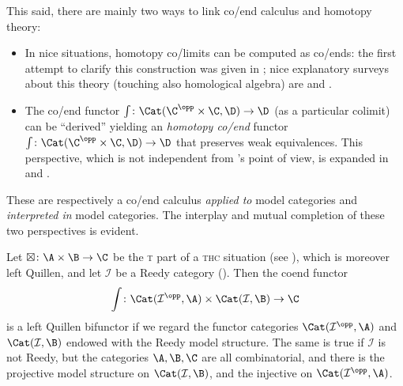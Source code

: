 This said, there are mainly two ways to link co/end calculus and homotopy theory:
\begin{itemize}
\item In nice situations, homotopy co/limits can be computed as co/ends: the first attempt to clarify this construction was given in \cite{MR0365573}; nice explanatory surveys about this theory (touching also homological algebra) are \cite{hormann2014homotopy} and \cite{Gamb}.%
\item The co/end functor $\int\colon \Cat(\C^\opp\times\C,\D)\to \D$ (as a particular colimit) can be ``derived'' yielding an \emph{homotopy co/end} functor $\int\colon \Cat(\C^\opp\times\C,\D)\to \D$ that preserves weak equivalences. This perspective, which is not independent from \cite{cordier1997homotopy}'s point of view, is expanded in \cite{DrorFar98} and \cite{Isaacson}.
\end{itemize}
These are respectively a co/end calculus \emph{applied to} model categories and \emph{interpreted in} model categories. The interplay and mutual completion of these two perspectives is evident.

\begin{remark}\label{coend_is_quillen}
Let $\boxtimes \colon \A \times \B \to \C$ be the \textsc{t} part of a \textsc{thc} situation (see ), which is moreover left Quillen, and let $\mathcal{I}$ be a Reedy category (\cite[\adef\textbf{5.2.1}]{Hov}). Then the coend functor
\[
\int \colon \Cat(\mathcal{I}^\opp,\A) \times \Cat(\mathcal{I},\B) \to \C
\]
is a left Quillen bifunctor if we regard the functor categories $\Cat(\mathcal{I}^\opp,\A)$ and $\Cat(\mathcal{I},\B)$ endowed with the Reedy model structure. The same is true if $\mathcal{I}$ is not Reedy, but the categories $\A,\B,\C$ are all combinatorial, and there is the projective model structure on $\Cat(\mathcal{I},\B)$, and the injective on $\Cat(\mathcal{I}^\opp,\A)$.
\end{remark}

